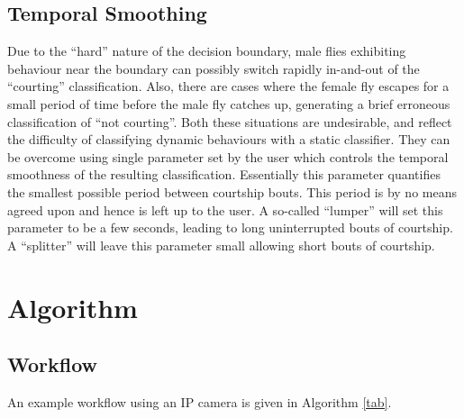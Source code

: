 \documentclass[twocolumn]{article}
\begin{document}
\subsection{Temporal Smoothing}

Due to the ``hard'' nature of the decision boundary, male flies exhibiting behaviour near the boundary can possibly switch rapidly in-and-out of the ``courting'' classification. Also, there are cases where the female fly escapes for a small period of time before the male fly catches up, generating a brief erroneous classification of ``not courting''. Both these situations are undesirable, and reflect the difficulty of classifying dynamic behaviours with a static classifier. They can be overcome using single parameter set by the user which controls the temporal smoothness of the resulting classification. Essentially this parameter quantifies the smallest possible period between courtship bouts. This period is by no means agreed upon and hence is left up to the user. A so-called ``lumper'' will set this parameter to be a few seconds, leading to long uninterrupted bouts of courtship. A ``splitter'' will leave this parameter small allowing short bouts of courtship.

\section{Algorithm}
\label{sec:algorithm}

\subsection{Workflow}

An example workflow using an IP camera is given in Algorithm \ref{tab}.
\end{document}
